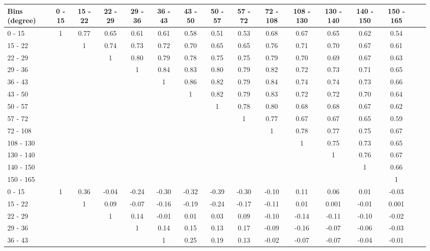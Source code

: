 \begingroup
\squeezetable
\begin{table}[h]
\begin{tabular}{l|ccccccccccccccc}
\hline\hline
Bins (degree) & 0 - 15 & 15 - 22 & 22 - 29 & 29 - 36 & 36 - 43 & 43 - 50 & 50 - 57 & 57 - 72 & 72 - 108 & 108 - 130 & 130 - 140 & 140 - 150 & 150 - 165 \\ 
\hline
0 - 15 & 1 & 0.77 & 0.65 & 0.61 & 0.61 & 0.58 & 0.51 & 0.53 & 0.68 & 0.67 & 0.65 & 0.62 & 0.54 \\ 
15 - 22 &  & 1 & 0.74 & 0.73 & 0.72 & 0.70 & 0.65 & 0.65 & 0.76 & 0.71 & 0.70 & 0.67 & 0.61 \\ 
22 - 29 &  &  & 1 & 0.80 & 0.79 & 0.78 & 0.75 & 0.75 & 0.79 & 0.70 & 0.69 & 0.67 & 0.63 \\ 
29 - 36 &  &  &  & 1 & 0.84 & 0.83 & 0.80 & 0.79 & 0.82 & 0.72 & 0.73 & 0.71 & 0.65 \\ 
36 - 43 &  &  &  &  & 1 & 0.86 & 0.82 & 0.79 & 0.84 & 0.74 & 0.74 & 0.73 & 0.66 \\ 
43 - 50 &  &  &  &  &  & 1 & 0.82 & 0.79 & 0.83 & 0.72 & 0.72 & 0.70 & 0.64 \\ 
50 - 57 &  &  &  &  &  &  & 1 & 0.78 & 0.80 & 0.68 & 0.68 & 0.67 & 0.62 \\ 
57 - 72 &  &  &  &  &  &  &  & 1 & 0.77 & 0.67 & 0.67 & 0.65 & 0.59 \\ 
72 - 108 &  &  &  &  &  &  &  &  & 1 & 0.78 & 0.77 & 0.75 & 0.67 \\ 
108 - 130 &  &  &  &  &  &  &  &  &  & 1 & 0.75 & 0.73 & 0.65 \\ 
130 - 140 &  &  &  &  &  &  &  &  &  &  & 1 & 0.76 & 0.67 \\ 
140 - 150 &  &  &  &  &  &  &  &  &  &  &  & 1 & 0.66 \\ 
150 - 165 &  &  &  &  &  &  &  &  &  &  &  &  & 1 \\ 
\hline
0 - 15 & 1 & 0.36 & -0.04 & -0.24 & -0.30 & -0.32 & -0.39 & -0.30 & -0.10 & 0.11 & 0.06 & 0.01 & -0.03 \\ 
15 - 22 &  & 1 & 0.09 & -0.07 & -0.16 & -0.19 & -0.24 & -0.17 & -0.11 & 0.01 & 0.001 & -0.01 & 0.001 \\ 
22 - 29 &  &  & 1 & 0.14 & -0.01 & 0.01 & 0.03 & 0.09 & -0.10 & -0.14 & -0.11 & -0.10 & -0.02 \\ 
29 - 36 &  &  &  & 1 & 0.14 & 0.15 & 0.13 & 0.17 & -0.09 & -0.16 & -0.07 & -0.06 & -0.03 \\ 
36 - 43 &  &  &  &  & 1 & 0.25 & 0.19 & 0.13 & -0.02 & -0.07 & -0.07 & -0.04 & -0.01 \\ 

\end{tabular}
\end{table}
